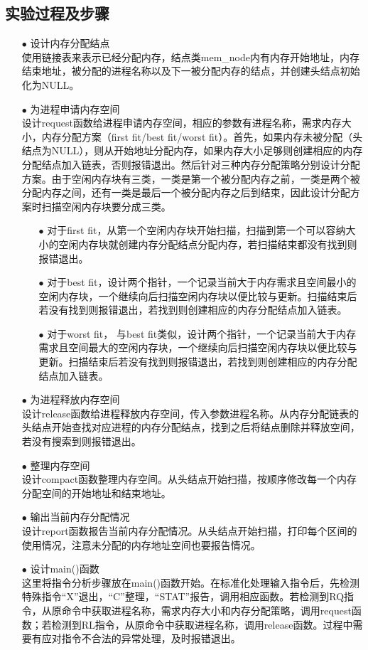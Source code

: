 \documentclass{article}
\begin{document}
\subsection{实验过程及步骤}
\begin{itemize}
\item[$\bullet$]设计内存分配结点\\
使用链接表来表示已经分配内存，结点类mem\_node内有内存开始地址，内存结束地址，被分配的进程名称以及下一被分配内存的结点，并创建头结点初始化为NULL。
\item[$\bullet$]为进程申请内存空间\\
设计request函数给进程申请内存空间，相应的参数有进程名称，需求内存大小，内存分配方案（first fit/best fit/worst fit）。首先，如果内存未被分配（头结点为NULL），则从开始地址分配内存，如果内存大小足够则创建相应的内存分配结点加入链表，否则报错退出。然后针对三种内存分配策略分别设计分配方案。由于空闲内存块有三类，一类是第一个被分配内存之前，一类是两个被分配内存之间，还有一类是最后一个被分配内存之后到结束，因此设计分配方案时扫描空闲内存块要分成三类。
\begin{itemize}
\item[$\bullet$]对于first fit，从第一个空闲内存块开始扫描，扫描到第一个可以容纳大小的空闲内存块就创建内存分配结点分配内存，若扫描结束都没有找到则报错退出。
\item[$\bullet$]对于best fit，设计两个指针，一个记录当前大于内存需求且空间最小的空闲内存块，一个继续向后扫描空闲内存块以便比较与更新。扫描结束后若没有找到则报错退出，若找到则创建相应的内存分配结点加入链表。
\item[$\bullet$]对于worst fit， 与best fit类似，设计两个指针，一个记录当前大于内存需求且空间最大的空闲内存块，一个继续向后扫描空闲内存块以便比较与更新。扫描结束后若没有找到则报错退出，若找到则创建相应的内存分配结点加入链表。
\end{itemize}
\item[$\bullet$]为进程释放内存空间\\
设计release函数给进程释放内存空间，传入参数进程名称。从内存分配链表的头结点开始查找对应进程的内存分配结点，找到之后将结点删除并释放空间，若没有搜索到则报错退出。
\item[$\bullet$]整理内存空间\\
设计compact函数整理内存空间。从头结点开始扫描，按顺序修改每一个内存分配空间的开始地址和结束地址。
\item[$\bullet$]输出当前内存分配情况\\
设计report函数报告当前内存分配情况。从头结点开始扫描，打印每个区间的使用情况，注意未分配的内存地址空间也要报告情况。
\item[$\bullet$]设计main()函数\\
这里将指令分析步骤放在main()函数开始。在标准化处理输入指令后，先检测特殊指令“X”退出，“C”整理，“STAT”报告，调用相应函数。若检测到RQ指令，从原命令中获取进程名称，需求内存大小和内存分配策略，调用request函数；若检测到RL指令，从原命令中获取进程名称，调用release函数。过程中需要有应对指令不合法的异常处理，及时报错退出。
\end{itemize}
\end{document}
